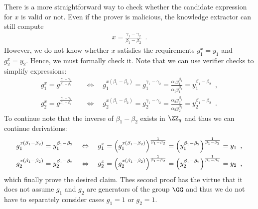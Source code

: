\documentclass{crypto-exercise}
\begin{document}
\begin{solution}
There is a more straightforward way to check whether the candidate expression for $x$ is valid or not. Even if the prover is malicious, the knowledge extractor can still compute
\begin{align*}
x = \frac{\gamma_1 - \gamma_2}{\beta_1 - \beta_2}\enspace.
\end{align*}
However, we do not know whether $x$ satisfies the requirements $g_1^x=y_1$ and $g_2^x=y_2$. Hence, we must formally check it. Note that we can use verifier checks to simplify expressions:
\begin{align*}
g_1^x=g^{\frac{\gamma_1 - \gamma_2}{\beta_1 - \beta_2}}\quad&\Leftrightarrow\quad g_1^{x(\beta_1-\beta_2)}=g_1^{\gamma_1-\gamma_2}=\frac{\alpha_1 y_1^{\beta_1}}{\alpha_1y_1^{\beta_2}}=y_1^{\beta_1-\beta_2}\enspace,\\
g_2^x=g^{\frac{\gamma_1 - \gamma_2}{\beta_1 - \beta_2}}\quad&\Leftrightarrow\quad g_2^{x(\beta_1-\beta_2)}=g_2^{\gamma_1-\gamma_2}=\frac{\alpha_2 y_2^{\beta_1}}{\alpha_2y_2^{\beta_2}}=y_2^{\beta_1-\beta_2}\enspace.
\end{align*}
To continue note that the inverse of $\beta_1-\beta_2$ exists in $\ZZ_q$ and thus we can continue derivations:
\begin{align*}
g_1^{x(\beta_1-\beta_2)}=y_1^{\beta_1-\beta_2}\quad&\Leftrightarrow\quad g_1^x=\Bigl(g_1^{x(\beta_1-\beta_2)}\Bigr)^{\frac{1}{\beta_1-\beta_2}}= \Bigl(y_1^{\beta_1-\beta_2}\Bigr)^{\frac{1}{\beta_1-\beta_2}}=y_1 \enspace,\\
g_2^{x(\beta_1-\beta_2)}=y_2^{\beta_1-\beta_2}\quad&\Leftrightarrow\quad g_2^x=\Bigl(g_2^{x(\beta_1-\beta_2)}\Bigr)^{\frac{1}{\beta_1-\beta_2}}= \Bigl(y_2^{\beta_1-\beta_2}\Bigr)^{\frac{1}{\beta_1-\beta_2}}=y_2\enspace,
\end{align*}
which finally prove the desired claim. Thes second proof has the virtue that it does not assume $g_1$ and $g_2$ are generators of the group $\GG$ and thus we do not have to separately consider cases $g_1=1$ or $g_2=1$. 
   


\end{solution}
\end{document}
